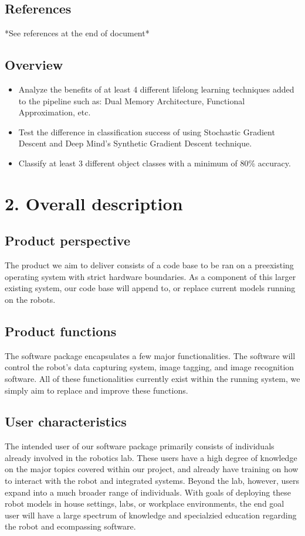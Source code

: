 \documentclass[a4paper, 10pt]{article}
\begin{document}
\subsection{References}
*See references at the end of document*
\subsection{Overview}
\begin{itemize}
\item Analyze the benefits of at least 4 different lifelong learning techniques added to the pipeline such as: Dual Memory Architecture, Functional Approximation, etc.
\item Test the difference in classification success of using Stochastic Gradient Descent and Deep Mind's Synthetic Gradient Descent technique.
\item Classify at least 3 different object classes with a minimum of 80\% accuracy.
\end{itemize}
\section{2. Overall description}
\subsection{Product perspective}
The product we aim to deliver consists of a code base to be ran on a preexisting operating system with strict hardware boundaries. As a component of this larger existing system, our code base will append to, or replace current models running on the robots. 

\subsection{Product functions}
The software package encapsulates a few major functionalities. The software will control the robot's data capturing system, image tagging, and image recognition software. All of these functionalities currently exist within the running system, we simply aim to replace and improve these functions.

\subsection{User characteristics}
The intended user of our software package primarily consists of individuals already involved in the robotics lab. These users have a high degree of knowledge on the major topics covered within our project, and already have training on how to interact with the robot and integrated systems. Beyond the lab, however, users expand into a much broader range of individuals. With goals of deploying these robot models in house settings, labs, or workplace environments, the end goal user will have a large spectrum of knowledge and specialzied education regarding the robot and ecompassing software. 
\end{document}
